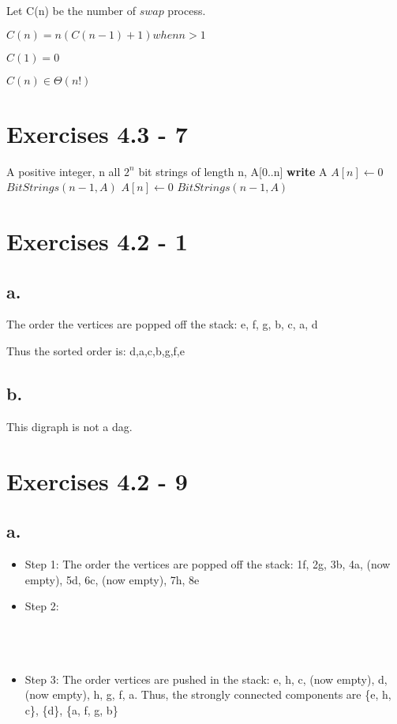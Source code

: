 \documentclass{article}
\begin{document}
Let C(n) be the number of $swap$ process.

$C(n) = n(C(n-1)+1) when n >1$

$C(1) = 0$

$C(n) \in \Theta(n!)$

\section{Exercises 4.3 - 7}

\begin{center}
\begin{algorithmic}
\INPUT
A positive integer, n
\OUTPUT
all $2^n$ bit strings of length n, A[0..n]
\State \textbf{write} A
\EndIf
\State $A[n] \leftarrow 0$
\State $BitStrings(n-1,A)$
\State $A[n] \leftarrow 0$
\State $BitStrings(n-1,A)$
\EndFunction
\end{algorithmic}
\end{center}

\section{Exercises 4.2 - 1}

\subsection*{a.}

The order the vertices are popped off the stack: e, f, g, b, c, a, d

Thus the sorted order is: d,a,c,b,g,f,e

\subsection*{b.}

This digraph is not a dag.

\section{Exercises 4.2 - 9}

\subsection*{a.}

\begin{itemize}
\item Step 1: The order the vertices are popped off the stack: 1f, 2g, 3b, 4a, (now empty), 5d, 6c, (now empty), 7h, 8e
\item Step 2:\\ \\ \\ \\
\item Step 3: The order vertices are pushed in the stack: e, h, c, (now empty), d, (now empty), h, g, f, a. Thus, the strongly connected components are \{e, h, c\}, \{d\}, \{a, f, g, b\}
\end{itemize}
\end{document}
